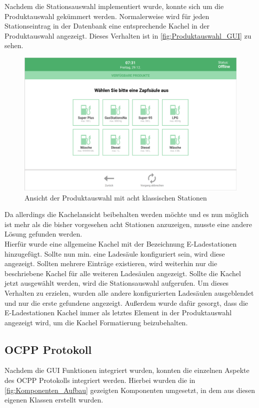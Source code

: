 \noindent Nachdem die Stationsauswahl implementiert wurde, konnte sich um die Produktauswahl gekümmert werden. Normalerweise wird für jeden Stationseintrag in der Datenbank eine entsprechende Kachel in der Produktauswahl angezeigt. Dieses Verhalten ist in \autoref{fig:Produktauswahl_GUI} zu sehen.

\begin{figure}[H]
	\centering
	\includegraphics[width=1.0\textwidth]{images/GUI/Produktauswahl.PNG}
	\caption{Ansicht der Produktauswahl mit acht klassischen Stationen \cite{Konzept}}
	\label{fig:Produktauswahl_GUI}
\end{figure}

\noindent Da allerdings die Kachelansicht beibehalten werden möchte und es nun möglich ist mehr als die bisher vorgesehen acht Stationen anzuzeigen, musste eine andere Lösung gefunden werden.\\
\noindent Hierfür wurde eine allgemeine Kachel mit der Bezeichnung \glqq{}E-Ladestationen\grqq{} hinzugefügt. Sollte nun min. eine Ladesäule konfiguriert sein, wird diese angezeigt. Sollten mehrere Einträge existieren, wird weiterhin nur die beschriebene Kachel für alle weiteren Ladesäulen angezeigt. Sollte die Kachel jetzt ausgewählt werden, wird die Stationsauswahl aufgerufen. Um dieses Verhalten zu erzielen, wurden alle andere konfigurierten Ladesäulen ausgeblendet und nur die erste gefundene angezeigt. Außerdem wurde dafür gesorgt, dass die \glqq{}E-Ladestationen\grqq{} Kachel immer als letztes Element in der Produktauswahl angezeigt wird, um die Kachel Formatierung beizubehalten.

\subsection{OCPP Protokoll}
Nachdem die GUI Funktionen integriert wurden, konnten die einzelnen Aspekte des OCPP Protokolls integriert werden. Hierbei wurden die in \autoref{fig:Komponenten_Aufbau} gezeigten Komponenten umgesetzt, in dem aus diesen eigenen Klassen erstellt wurden.
